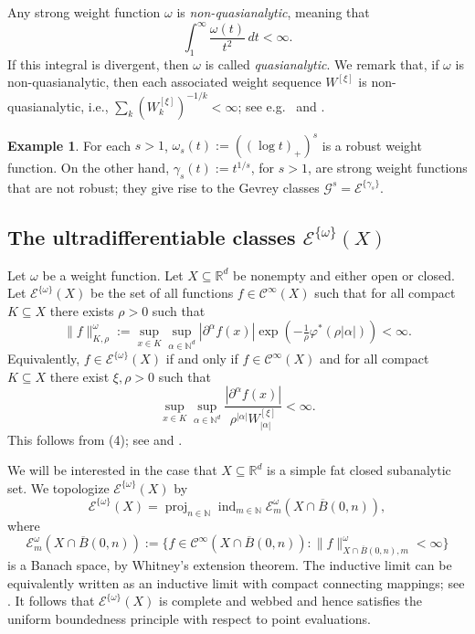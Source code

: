 \documentclass[10pt, reqno]{amsart}
\theoremstyle{plain}
\theoremstyle{definition}
\newtheorem{example}[theorem]{Example}
\numberwithin{equation}{section}
\def\al{\alpha}
\def\ga{\gamma}
\def\rh{\rho}
\def\vh{\varphi}
\def\om{\omega}
\def\N{\mathbb{N}}
\def\R{\mathbb{R}}
\def\cC{\mathcal{C}}
\def\cE{\mathcal{E}}
\def\cG{\mathcal{G}}
\def\p{\partial}
\def\ol{\overline}
\let\on=\operatorname
\begin{document}
Any strong weight function $\om$ is \emph{non-quasianalytic}, meaning that
\[
   \int_1^\infty \frac{\om(t)}{t^2}\, dt < \infty. 
\]
If this integral is divergent, then $\om$ is called \emph{quasianalytic}.
We remark that, if $\om$ is non-quasianalytic, then each associated weight sequence $W^{[\xi]}$ is non-quasianalytic, 
i.e., $\sum_{k} (W^{[\xi]}_k)^{-1/k} < \infty$; see e.g.\ \cite[Theorem 11.17]{Rainer:2021aa} and .



\begin{example}
    For each $s>1$, $\om_s(t) := ((\log t)_+)^s$ is a robust weight function. 
    On the other hand, $\ga_s(t) := t^{1/s}$, for $s>1$, are strong weight functions that are not robust; 
    they give rise to the Gevrey classes $\cG^s = \cE^{\{\ga_s\}}$.
\end{example}

\subsection{The ultradifferentiable classes \texorpdfstring{$\cE^{\{\om\}}(X)$}{Eomega(X)}} \label{d:Eom}
Let $\om$ be a weight function.
Let $X \subseteq \R^d$ be nonempty and either open or closed. Let $\cE^{\{\om\}}(X)$ be the set of all functions $f \in \cC^\infty(X)$ 
such that for all compact $K \subseteq X$ there exists $\rh>0$ such that 
\begin{equation}
    \|f\|^\om_{K,\rh} := \sup_{x \in K}\sup_{\al \in \N^d} |\p^\al f(x)|\exp(-\tfrac{1}{\rh} \vh^*(\rh |\al|)) < \infty.
\end{equation}
Equivalently, $f \in \cE^{\{\om\}}(X)$ if and only if $f \in \cC^\infty(X)$ and
for all compact $K \subseteq X$ there exist $\xi,\rh>0$ such that 
\begin{equation}
    \sup_{x \in K}\sup_{\al \in \N^d} \frac{|\p^\al f(x)|}{\rh^{|\al|} W^{[\xi]}_{|\al|}} < \infty.
\end{equation}
This follows from (4); see \cite[Theorem 11.4]{Rainer:2021aa} and \cite[Theorem 5.14]{RainerSchindl12}.

We will be interested in the case that 
$X \subseteq \R^d$ is a simple fat closed subanalytic set. 
We topologize $\cE^{\{\om\}}(X)$ by 
\[
    \cE^{\{\om\}}(X) = \on{proj}_{n \in \N} \on{ind}_{m \in \N} \cE^\om_m(X \cap \ol B(0,n)),
\]
where 
\[
    \cE^\om_m(X \cap \ol B(0,n)) := \{ f \in \cC^\infty(X \cap \ol B(0,n)) : \| f\|^\om_{X \cap \ol B(0,n),m} < \infty\}
\]
is a Banach space, by Whitney's extension theorem.
The inductive limit can be equivalently written as an inductive limit with compact connecting mappings; see . 
It follows that $\cE^{\{\om\}}(X)$ is complete and webbed and hence 
satisfies the uniform boundedness principle with respect to point evaluations.
\end{document}

